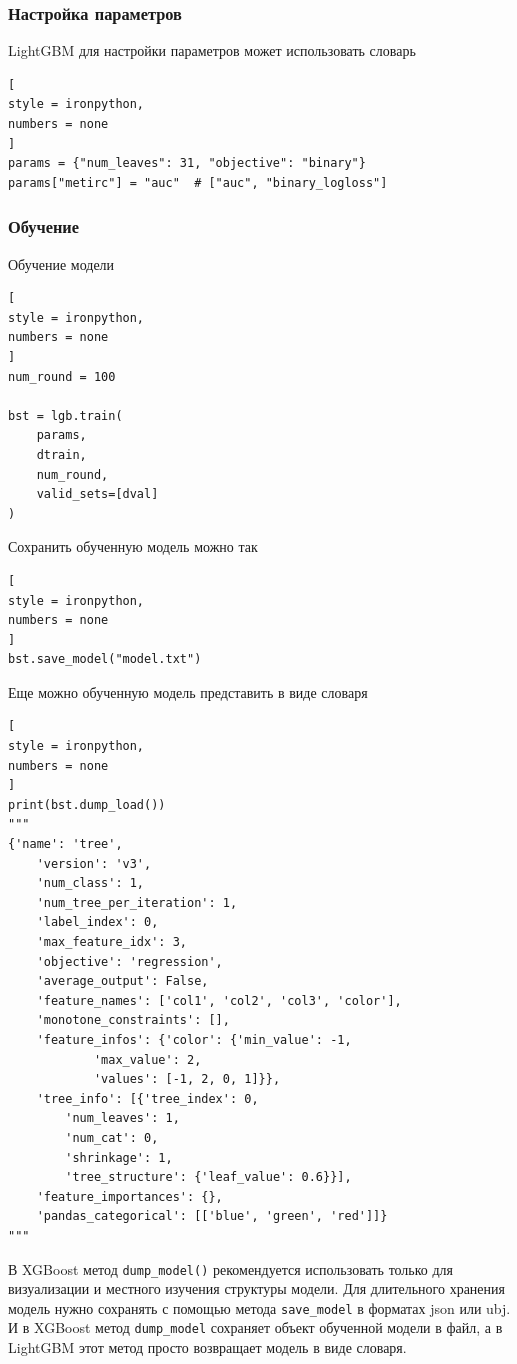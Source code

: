 \documentclass[%
	11pt,
	a4paper,
	utf8,
		]{article}
\begin{document}
\subsubsection{Настройка параметров}

LightGBM для настройки параметров может использовать словарь
\begin{lstlisting}[
style = ironpython,
numbers = none
]
params = {"num_leaves": 31, "objective": "binary"}
params["metirc"] = "auc"  # ["auc", "binary_logloss"]
\end{lstlisting}

\subsubsection{Обучение}

Обучение модели
\begin{lstlisting}[
style = ironpython,
numbers = none
]
num_round = 100

bst = lgb.train(
    params,
    dtrain,
    num_round,
    valid_sets=[dval]
)
\end{lstlisting}

Сохранить обученную модель можно так
\begin{lstlisting}[
style = ironpython,
numbers = none
]
bst.save_model("model.txt")
\end{lstlisting}

Еще можно обученную модель представить в виде словаря 
\begin{lstlisting}[
style = ironpython,
numbers = none
]
print(bst.dump_load())
"""
{'name': 'tree',
	'version': 'v3',
	'num_class': 1,
	'num_tree_per_iteration': 1,
	'label_index': 0,
	'max_feature_idx': 3,
	'objective': 'regression',
	'average_output': False,
	'feature_names': ['col1', 'col2', 'col3', 'color'],
	'monotone_constraints': [],
	'feature_infos': {'color': {'min_value': -1,
			'max_value': 2,
			'values': [-1, 2, 0, 1]}},
	'tree_info': [{'tree_index': 0,
		'num_leaves': 1,
		'num_cat': 0,
		'shrinkage': 1,
		'tree_structure': {'leaf_value': 0.6}}],
	'feature_importances': {},
	'pandas_categorical': [['blue', 'green', 'red']]}
"""
\end{lstlisting}

В XGBoost метод \verb|dump_model()| рекомендуется использовать только для визуализации и местного изучения структуры модели. Для длительного хранения модель нужно сохранять с помощью метода \verb|save_model| в форматах json или ubj. И в XGBoost метод \verb|dump_model| сохраняет объект обученной модели в файл, а в LightGBM этот метод просто возвращает модель в виде словаря.
\end{document}
